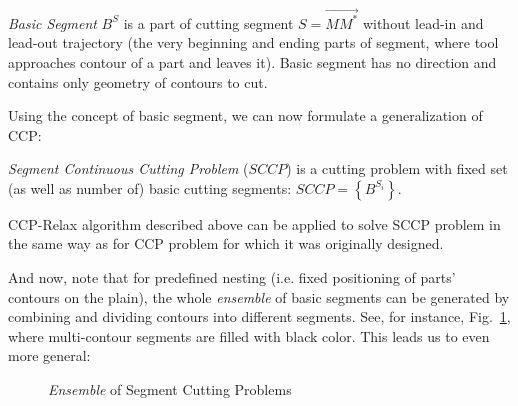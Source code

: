 \documentclass[]{llncs}
\begin{document}
{\it Basic Segment}
$B^S$
is a part of cutting segment
$S = \overrightarrow{M M^*}$
without lead-in  and lead-out trajectory
(the very beginning and ending parts of segment,
where tool approaches contour of a part
and leaves it).
Basic segment has no direction and
contains only geometry of contours to cut.

Using the concept of basic segment,
we can now formulate a generalization of CCP:

{\it Segment Continuous Cutting Problem}
($SCCP$)
is a cutting problem with fixed set
(as well as number of)
basic cutting segments:
$SCCP = \left\{B^{S_i}\right\}$.

CCP-Relax algorithm described above
can be applied to solve SCCP problem
in the same way as for CCP problem
for which it was originally designed.

And now,
note that
for predefined nesting
(i.e. fixed positioning of
parts' contours on the plain),
the whole {\it ensemble} of basic segments
can be generated
by combining and dividing
contours into different segments.
See, for instance,
Fig.~\ref{fig:gsccp},
where multi-contour segments
are filled with black color.
This leads us to even more general:

\begin{figure}
  \centering
  \caption{{\it Ensemble} of Segment Cutting Problems}
  \label{fig:gsccp}
\end{figure}
\end{document}
